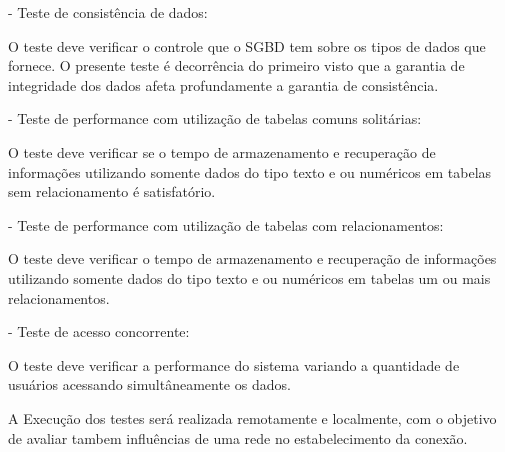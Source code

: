 - Teste de consistência de dados:

O teste deve verificar o controle que o SGBD tem sobre os tipos de dados que fornece. O presente teste é decorrência do primeiro visto que a garantia de integridade dos dados afeta profundamente a garantia de consistência.

- Teste de performance com utilização de tabelas comuns solitárias:

O teste deve verificar se o tempo de armazenamento e recuperação de informações utilizando somente dados do tipo texto e ou numéricos em tabelas sem relacionamento é satisfatório.

- Teste de performance com utilização de tabelas com relacionamentos:

O teste deve verificar o tempo de armazenamento e recuperação de informações utilizando somente dados do tipo texto e ou numéricos em tabelas um ou mais relacionamentos.

- Teste de acesso concorrente:

O teste deve verificar a performance do sistema variando a quantidade de usuários acessando simultâneamente os dados.

A Execução dos testes será realizada remotamente e localmente, com o objetivo de avaliar tambem influências de uma rede no estabelecimento da conexão.



